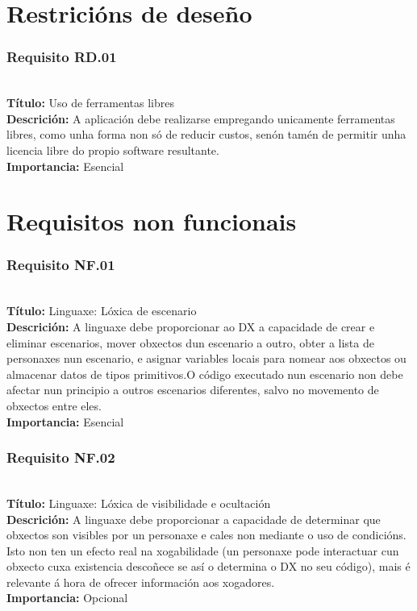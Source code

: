 \section{Restricións de deseño}

\subsubsection{Requisito RD.01}~\\
{\bf Título:} Uso de ferramentas libres\\
{\bf Descrición:} A aplicación debe realizarse empregando unicamente
ferramentas libres, como unha forma non só de reducir custos, senón tamén de
permitir unha licencia libre do propio software resultante.\\
{\bf Importancia:} Esencial


\section{Requisitos non funcionais}

\subsubsection{Requisito NF.01}~\\
{\bf Título:} Linguaxe: Lóxica de escenario\\
{\bf Descrición:} A linguaxe debe proporcionar ao DX a capacidade de crear e
eliminar escenarios, mover obxectos dun escenario a outro, obter a lista de
personaxes nun escenario, e asignar variables locais para nomear aos obxectos ou
almacenar datos de tipos primitivos.O código executado nun escenario non debe
afectar nun principio a outros escenarios diferentes, salvo no movemento de
obxectos entre eles.\\
{\bf Importancia:} Esencial

\subsubsection{Requisito NF.02}~\\
{\bf Título:} Linguaxe: Lóxica de visibilidade e ocultación\\
{\bf Descrición:} A linguaxe debe proporcionar a capacidade de determinar que
obxectos son visibles por un personaxe e cales non mediante o uso de
condicións. Isto non ten un efecto real na xogabilidade (un personaxe pode
interactuar cun obxecto cuxa existencia descoñece se así o determina o DX no
seu código), mais é relevante á hora de ofrecer información aos xogadores. \\
{\bf Importancia:} Opcional


